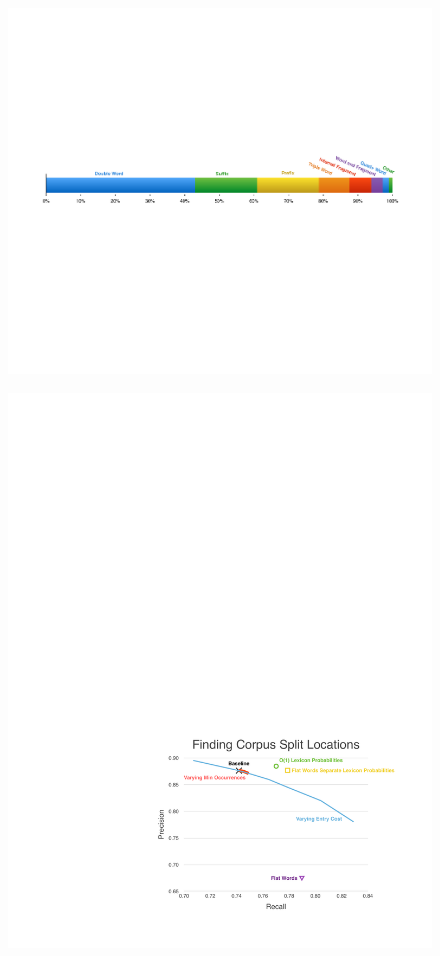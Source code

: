 \documentclass[11pt, oneside, fleqn]{article}
\begin{document}
  \begin{figure}[h]
  \includegraphics[scale=0.6]{./figure/error_nature_classfier.pdf}
  \end{figure}
  
  \begin{figure}[h]
  \includegraphics{./figure/finding_corpus_split_location.pdf}
  \end{figure}
\end{document}
